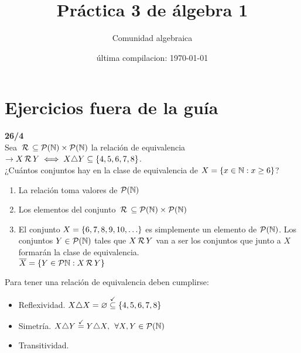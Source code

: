 




\title{Práctica 3 de álgebra 1} %
\author{Comunidad algebraica} %
\date{última compilacion: \today} %
\section*{Ejercicios fuera de la guía}
\textbf{26/4}\\
Sea $\,\mathcal{R}\, \subseteq \mathcal P(\mathbb N) \times \mathcal P(\mathbb N)$ la relación de equivalencia
$\to X \,\mathcal{R}\, Y \iff X \triangle Y \subseteq \left\{ 4,5,6,7,8 \right\}$.\\
¿Cuántos conjuntos hay en la clase de equivalencia de $X = \left\{ x \in \mathbb N : x \geq 6 \right\}$?

\separadorCorto

\begin{enumerate}
	\item La relación toma valores de $\mathcal P(\mathbb N)$

	\item Los elementos del conjunto $\,\mathcal{R}\, \subseteq \mathcal P(\mathbb N) \times \mathcal P(\mathbb N)$

	\item El conjunto $X = \set{\foreach \i in {6,...,10}{\i, }\dots}$ es simplemente un elemento de $\mathcal P(\mathbb N)$.
	      Los conjuntos $Y \in \mathcal P(\mathbb N)$ tales que $X \,\mathcal{R}\, Y$ van a ser los conjuntos que junto a $X$ formarán la
	      clase de equivalencia.\\
	      $ \overline{X} = \left\{ Y \in \mathcal P{\mathbb N} : X \,\mathcal{R}\, Y \right\}$
\end{enumerate}

Para tener una relación de equivalencia deben cumplirse:
\begin{itemize}
	\item Reflexividad. $X \triangle X = \varnothing \stackrel{\checkmark}\subseteq \left\{ 4,5,6,7,8 \right\}$
	\item Simetría. $X \triangle Y \stackrel{\checkmark}= Y \triangle X,\, \;\forall X,Y \in \mathcal P(\mathbb N)$
	\item Transitividad.
\end{itemize}

